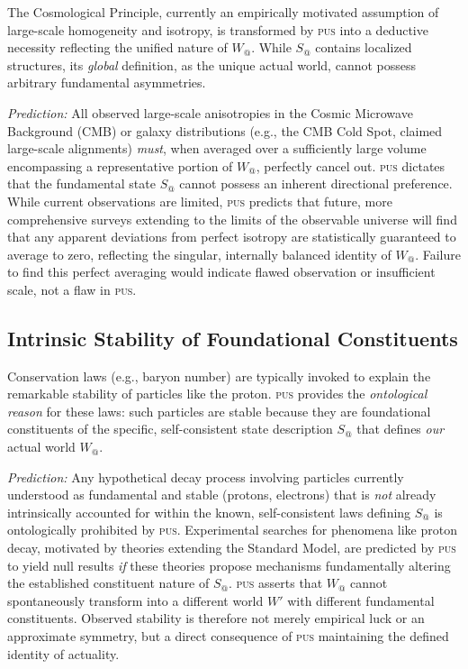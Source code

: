 \documentclass[11pt, a4paper]{article}
\makeatletter
\newcommand{\pus}{\textsc{pus}} %
\newcommand{\Wactual}{W_{@}} %
\newcommand{\Sactual}{S_{@}} %
\makeatother
\begin{document}
The Cosmological Principle, currently an empirically motivated assumption of large-scale homogeneity and isotropy, is transformed by \pus{} into a deductive necessity reflecting the unified nature of $\Wactual$. While $\Sactual$ contains localized structures, its \textit{global} definition, as the unique actual world, cannot possess arbitrary fundamental asymmetries.

\textit{Prediction:} All observed large-scale anisotropies in the Cosmic Microwave Background (CMB) or galaxy distributions (e.g., the CMB Cold Spot, claimed large-scale alignments) \textit{must}, when averaged over a sufficiently large volume encompassing a representative portion of $\Wactual$, perfectly cancel out. \pus{} dictates that the fundamental state $\Sactual$ cannot possess an inherent directional preference. While current observations are limited, \pus{} predicts that future, more comprehensive surveys extending to the limits of the observable universe will find that any apparent deviations from perfect isotropy are statistically guaranteed to average to zero, reflecting the singular, internally balanced identity of $\Wactual$. Failure to find this perfect averaging would indicate flawed observation or insufficient scale, not a flaw in \pus.

\subsection{Intrinsic Stability of Foundational Constituents}

Conservation laws (e.g., baryon number) are typically invoked to explain the remarkable stability of particles like the proton. \pus{} provides the \textit{ontological reason} for these laws: such particles are stable because they are foundational constituents of the specific, self-consistent state description $\Sactual$ that defines \textit{our} actual world $\Wactual$.

\textit{Prediction:} Any hypothetical decay process involving particles currently understood as fundamental and stable (protons, electrons) that is \textit{not} already intrinsically accounted for within the known, self-consistent laws defining $\Sactual$ is ontologically prohibited by \pus. Experimental searches for phenomena like proton decay, motivated by theories extending the Standard Model, are predicted by \pus{} to yield null results \textit{if} these theories propose mechanisms fundamentally altering the established constituent nature of $\Sactual$. \pus{} asserts that $\Wactual$ cannot spontaneously transform into a different world $W'$ with different fundamental constituents. Observed stability is therefore not merely empirical luck or an approximate symmetry, but a direct consequence of \pus{} maintaining the defined identity of actuality.
\end{document}
